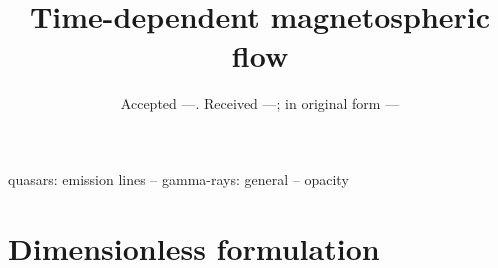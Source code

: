 \documentclass[usenatbib]{mnras}
\title[]{Time-dependent magnetospheric flow}
\author[]{}
\begin{document}
\date{Accepted ---. Received ---; in
  original form --- }

\label{firstpage}
\pagerange{\pageref{firstpage}--\pageref{lastpage}} 
\maketitle

\begin{abstract}

\end{abstract}

\begin{keywords}
quasars: emission lines -- gamma-rays: general -- opacity
\end{keywords}

\section{Dimensionless formulation}
\end{document}
